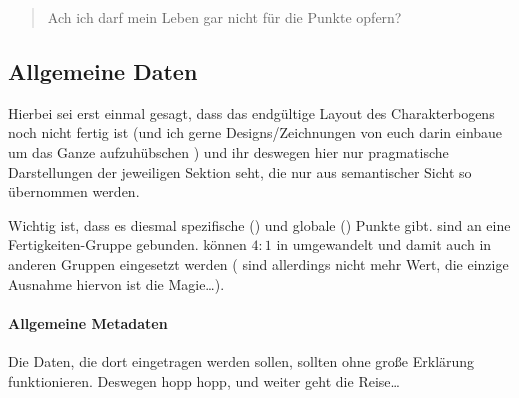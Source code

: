 \label{sec:charakterbogen}\begin{quote}
    Ach ich darf mein Leben gar nicht für die Punkte opfern?
\end{quote}
\subsection{Allgemeine Daten}

Hierbei sei erst einmal gesagt, dass das endgültige Layout des Charakterbogens noch nicht fertig ist (und ich gerne Designs/Zeichnungen von euch darin einbaue um das Ganze aufzuhübschen \Laughey) und ihr deswegen hier nur pragmatische Darstellungen der jeweiligen Sektion seht, die nur aus semantischer Sicht so übernommen werden.

Wichtig ist, dass es diesmal spezifische (\SP{}) und globale (\GP{}) Punkte gibt. \SP{} sind an eine Fertigkeiten-Gruppe gebunden. \SP{} können \(4:1\) in \GP{} umgewandelt und damit auch in anderen Gruppen eingesetzt werden (\GP{} sind allerdings nicht mehr Wert, die einzige Ausnahme hiervon ist die Magie\ldots).%

\paragraph{Allgemeine Metadaten}
\begin{sccenter}
\end{sccenter}
Die Daten, die dort eingetragen werden sollen, sollten ohne große Erklärung funktionieren. Deswegen hopp hopp, und weiter geht die Reise\ldots

